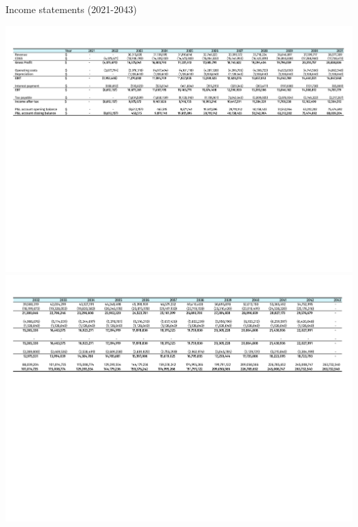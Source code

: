  
 \newpage
 \begin{landscape}
\begin{table}
\label{tab:Income}
  \caption{Income statements (2021-2043)}
\includegraphics[clip, trim=0cm 12cm 0cm 1cm, width=\linewidth]{chapters/Z-support/attachments/Income1.pdf}\\

\includegraphics[clip, trim=0cm 12cm 0cm 1cm, width=\linewidth]{chapters/Z-support/attachments/Income2.pdf}
\end{table}
 \end{landscape}

